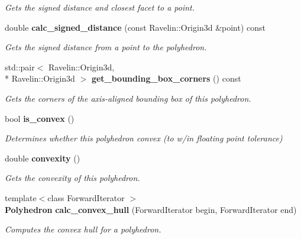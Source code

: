 \begin{DoxyCompactItemize}
\begin{DoxyCompactList}\small\item\em Gets the signed distance and closest facet to a point. \end{DoxyCompactList}\item 
double {\bf calc\-\_\-signed\-\_\-distance} (const Ravelin\-::\-Origin3d \&point) const \label{classMoby_1_1Polyhedron_a5ecb8756efc37a78f3c2a7a6833ae367}

\begin{DoxyCompactList}\small\item\em Gets the signed distance from a point to the polyhedron. \end{DoxyCompactList}\item 
std\-::pair$<$ Ravelin\-::\-Origin3d, \\*
Ravelin\-::\-Origin3d $>$ {\bf get\-\_\-bounding\-\_\-box\-\_\-corners} () const \label{classMoby_1_1Polyhedron_aa812e2865477420a867ec58e0192eba8}

\begin{DoxyCompactList}\small\item\em Gets the corners of the axis-\/aligned bounding box of this polyhedron. \end{DoxyCompactList}\item 
bool {\bf is\-\_\-convex} ()\label{classMoby_1_1Polyhedron_a0517cc02de0d0df45b1c30333303ed29}

\begin{DoxyCompactList}\small\item\em Determines whether this polyhedron convex (to w/in floating point tolerance) \end{DoxyCompactList}\item 
double {\bf convexity} ()
\begin{DoxyCompactList}\small\item\em Gets the convexity of this polyhedron. \end{DoxyCompactList}\item 
{\footnotesize template$<$class Forward\-Iterator $>$ }\\{\bf Polyhedron} {\bf calc\-\_\-convex\-\_\-hull} (Forward\-Iterator begin, Forward\-Iterator end)\label{classMoby_1_1Polyhedron_ab5c6b4a9e78a7f780cd94148340c705b}

\begin{DoxyCompactList}\small\item\em Computes the convex hull for a polyhedron. \end{DoxyCompactList}\end{DoxyCompactItemize}
